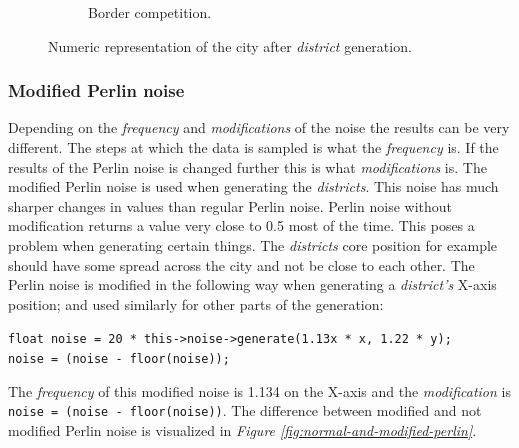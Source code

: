\begin{figure}[h]
\begin{subfigure}{0.5\textwidth}
				\caption{Border competition.}
				\label{fig:map-borders}
			\end{subfigure}
			\caption{Numeric representation of the city after \textit{district} generation.}
			\label{fig:map-districts-and-borders}
		\end{figure}
		
		\subsubsection{Modified Perlin noise}
		Depending on the \textit{frequency} and \textit{modifications} of the noise the results can be very different. The steps at which the data is sampled is what the \textit{frequency} is. If the results of the Perlin noise is changed further this is what \textit{modifications} is.
		The modified Perlin noise is used when generating the \textit{districts}. This noise has much sharper changes in values than regular Perlin noise. Perlin noise without modification returns a value very close to 0.5 most of the time. This poses a problem when generating certain things. The \textit{districts} core position for example should have some spread across the city and not be close to each other. The Perlin noise is modified in the following way when generating a \textit{district's} X-axis position; and used similarly for other parts of the generation:
		
		\texttt{float noise = 20 * this->noise->generate(1.13x * x, 1.22 * y);\\
			noise = (noise - floor(noise));}
		
		The \textit{frequency} of this modified noise is 1.134 on the X-axis and the \textit{modification} is \texttt{noise = (noise - floor(noise))}.
		The difference between modified and not modified Perlin noise is visualized in \textit{Figure \ref{fig:normal-and-modified-perlin}}.
		
